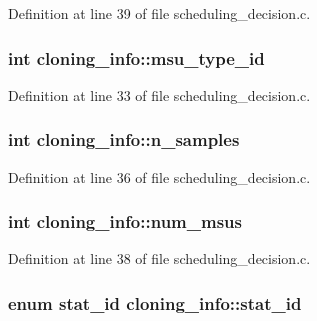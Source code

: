 Definition at line 39 of file scheduling\-\_\-decision.\-c.

\hypertarget{structcloning__info_a33d2da60c6da8d63787ccd31abb1dcd2}{
\subsubsection[{msu\-\_\-type\-\_\-id}]{\setlength{\rightskip}{0pt plus 5cm}int cloning\-\_\-info\-::msu\-\_\-type\-\_\-id}}\label{structcloning__info_a33d2da60c6da8d63787ccd31abb1dcd2}


Definition at line 33 of file scheduling\-\_\-decision.\-c.

\hypertarget{structcloning__info_a40588709a6807365c9d2a8554f08054d}{
\subsubsection[{n\-\_\-samples}]{\setlength{\rightskip}{0pt plus 5cm}int cloning\-\_\-info\-::n\-\_\-samples}}\label{structcloning__info_a40588709a6807365c9d2a8554f08054d}


Definition at line 36 of file scheduling\-\_\-decision.\-c.

\hypertarget{structcloning__info_a0d133d4ff8e0148eee7cda34b3e5627f}{
\subsubsection[{num\-\_\-msus}]{\setlength{\rightskip}{0pt plus 5cm}int cloning\-\_\-info\-::num\-\_\-msus}}\label{structcloning__info_a0d133d4ff8e0148eee7cda34b3e5627f}


Definition at line 38 of file scheduling\-\_\-decision.\-c.

\hypertarget{structcloning__info_ae9b537be6398899a7e53f694445bc867}{
\subsubsection[{stat\-\_\-id}]{\setlength{\rightskip}{0pt plus 5cm}enum {\bf stat\-\_\-id} cloning\-\_\-info\-::stat\-\_\-id}}\label{structcloning__info_ae9b537be6398899a7e53f694445bc867}


